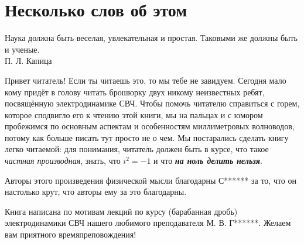 \chapter*{Несколько слов об этом}

\begin{flushright}
{\scriptsize Наука должна быть веселая, увлекательная и простая. Таковыми же должны быть и ученые.\\
П. Л. Капица}
\end{flushright}

    Привет читатель! Если ты читаешь это, то мы тебе не завидуем. Сегодня мало
    кому придёт в голову читать брошюрку двух никому неизвестных ребят,
    посвящённую электродинамике СВЧ. Чтобы помочь читателю справиться с горем,
    которое сподвигло его к чтению этой книги, мы на пальцах и с юмором
    пробежимся по основным аспектам и особенностям миллиметровых волноводов,
    потому как больше писать тут просто не о чем. Мы постарались сделать книгу
    легко читаемой: для понимания, читатель должен быть в курсе, что такое
    \emph{частная производная}, знать, что \( i^2 = -1 \) и что
    \emph{\bfseries на ноль делить нельзя}.

    Авторы этого произведения физической мысли благодарны С****** за то, что он
    настолько крут, что авторы ему за это благодарны.

    Книга написана по мотивам лекций по курсу (барабанная дробь) электродинамики
    СВЧ нашего любимого преподавателя М. В. Г******. Желаем вам приятного
    времяпреповождения!


